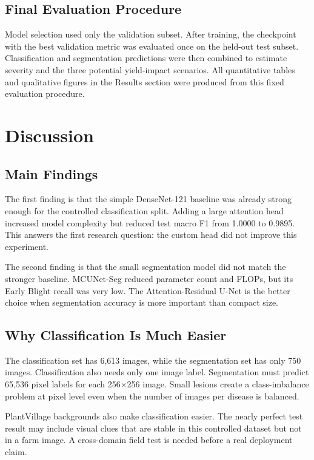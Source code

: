 \documentclass[12pt,a4paper]{article}
\begin{document}
\subsection{Final Evaluation Procedure}
Model selection used only the validation subset. After training, the checkpoint with the
best validation metric was evaluated once on the held-out test subset. Classification and
segmentation predictions were then combined to estimate severity and the three potential
yield-impact scenarios. All quantitative tables and qualitative figures in the Results
section were produced from this fixed evaluation procedure.

\section{Discussion}

\subsection{Main Findings}
The first finding is that the simple DenseNet-121 baseline was already strong enough for
the controlled classification split. Adding a large attention head increased model
complexity but reduced test macro F1 from 1.0000 to 0.9895. This answers the
first research question: the custom head did not improve this experiment.

The second finding is that the small segmentation model did not match the stronger
baseline. MCUNet-Seg reduced parameter count and FLOPs, but its Early Blight recall was
very low. The Attention-Residual U-Net is the better choice when segmentation accuracy is
more important than compact size.

\subsection{Why Classification Is Much Easier}
The classification set has 6,613 images, while the segmentation set has only 750 images.
Classification also needs only one image label. Segmentation must predict 65,536 pixel
labels for each 256$\times$256 image. Small lesions create a class-imbalance problem at
pixel level even when the number of images per disease is balanced.

PlantVillage backgrounds also make classification easier. The nearly perfect test result
may include visual clues that are stable in this controlled dataset but not in a farm image.
A cross-domain field test is needed before a real deployment claim.
\end{document}
